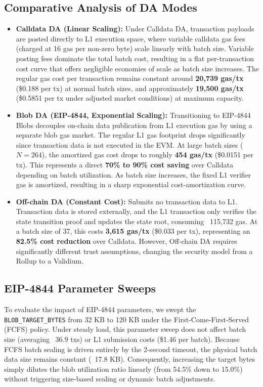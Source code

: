 \subsection{Comparative Analysis of DA Modes}
\begin{itemize}
    \item \textbf{Calldata DA (Linear Scaling):} Under Calldata DA, transaction payloads are posted directly to L1 execution space, where variable calldata gas fees (charged at 16 gas per non-zero byte) scale linearly with batch size. Variable posting fees dominate the total batch cost, resulting in a flat per-transaction cost curve that offers negligible economies of scale as batch size increases. The regular gas cost per transaction remains constant around \textbf{20,739 gas/tx} (\$0.188 per tx) at normal batch sizes, and approximately \textbf{19,500 gas/tx} (\$0.5851 per tx under adjusted market conditions) at maximum capacity.
    \item \textbf{Blob DA (EIP-4844, Exponential Scaling):} Transitioning to EIP-4844 Blobs decouples on-chain data publication from L1 execution gas by using a separate blob gas market. The regular L1 gas footprint drops significantly since transaction data is not executed in the EVM. At large batch sizes ($N=264$), the amortized gas cost drops to roughly \textbf{454 gas/tx} (\$0.0151 per tx). This represents a direct \textbf{70\% to 90\% cost saving} over Calldata depending on batch utilization. As batch size increases, the fixed L1 verifier gas is amortized, resulting in a sharp exponential cost-amortization curve.
    \item \textbf{Off-chain DA (Constant Cost):} Submits no transaction data to L1. Transaction data is stored externally, and the L1 transaction only verifies the state transition proof and updates the state root, consuming ~115,732 gas. At a batch size of 37, this costs \textbf{3,615 gas/tx} (\$0.033 per tx), representing an \textbf{82.5\% cost reduction} over Calldata. However, Off-chain DA requires significantly different trust assumptions, changing the security model from a Rollup to a Validium.
\end{itemize}
\subsection{EIP-4844 Parameter Sweeps}
To evaluate the impact of EIP-4844 parameters, we swept the \texttt{BLOB\_TARGET\_BYTES} from 32 KB to 120 KB under the First-Come-First-Served (FCFS) policy. Under steady load, this parameter sweep does not affect batch size (averaging ~36.9 txs) or L1 submission costs (\$1.46 per batch). Because FCFS batch sealing is driven entirely by the 2-second timeout, the physical batch data size remains constant (~17.8 KB). Consequently, increasing the target bytes simply dilutes the blob utilization ratio linearly (from 54.5\% down to 15.0\%) without triggering size-based sealing or dynamic batch adjustments.
